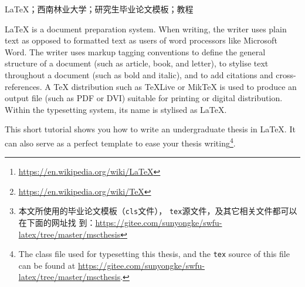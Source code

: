 \documentclass{swfuthesism}
\begin{document}
\maketitle

\begin{abstract}
    \LaTeX{}\footnote{\url{https://en.wikipedia.org/wiki/LaTeX}}是一种基于
  \TeX{}\footnote{\url{https://en.wikipedia.org/wiki/TeX}}文件格式的排版系统，由美国电脑学
  家莱斯利·兰伯特在20世纪80年代初期开发。利用这种格式，即使用户没有排版和程序设计的知识，也
  可以充分利用TEX所提供的强大功能，在几天，甚至几小时内生成很多具有书籍质量的印刷品。对于生成复杂表格和数学公式，
  这一点表现得尤为突出。因此它非常适用于生成高印刷质量的科技和数学类文档。这个系统同样适用
  于生成从简单如信件到完整如书籍的所有种类的文档\cite{wiki:latexcn}。

  本文对如何利用\LaTeX{}来撰写西南林业大学研究生毕业论文做一个简要的介绍。读者也可以将本文作
  为毕业论文模板来使用\footnote{本文所使用的毕业论文模板（\texttt{cls}文件），
    \texttt{tex}源文件，及其它相关文件都可以在下面的网址找
    到：\url{https://gitee.com/sunyongke/swfu-latex/tree/master/mscthesis}}。
\end{abstract}

\begin{keyword}
  \LaTeX{}；西南林业大学；研究生毕业论文模板；教程  
\end{keyword}

\begin{eabstract}
  \LaTeX{} is a document preparation system. When writing, the writer uses plain text as
  opposed to formatted text as users of word processors like Microsoft Word. The writer
  uses markup tagging conventions to define the general structure of a document (such as
  article, book, and letter), to stylise text throughout a document (such as bold and
  italic), and to add citations and cross-references. A \TeX{} distribution such as
  \TeX{}Live or Mik\TeX{} is used to produce an output file (such as PDF or DVI) suitable
  for printing or digital distribution. Within the typesetting system, its name is
  stylised as \LaTeX{}\cite{wiki:latex}.

  This short tutorial shows you how to write an undergraduate thesis in \LaTeX{}. It can
  also serve as a perfect template to ease your thesis writing\footnote{The class file
    used for typesetting this thesis, and the \texttt{tex} source of this file can be
    found at \url{https://gitee.com/sunyongke/swfu-latex/tree/master/mscthesis}.}.
\end{eabstract}
\end{document}
